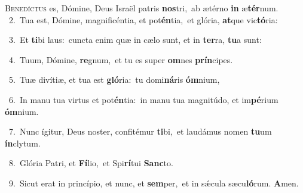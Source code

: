 \lettrine{\initial\textcolor{\initialcolor}{B}}{enedíctus} es, Dómine, Deus Israël patris \textbf{nos}\-tri,~\star ab ætérno \textbf{in} æ\-\textbf{tér}\-num.\\
{\numbfont\textcolor{\numbcolor}{~2.}}~Tua est, Dómine, magnificéntia, et pot\-\textbf{én}\-tia,~\star et glória, \textbf{at}\-que vic\-\textbf{tó}\-ria:\par
{\numbfont\textcolor{\numbcolor}{~3.}}~Et \textbf{ti}\-bi laus:~\star cuncta enim quæ in cælo sunt, et in \textbf{ter}\-ra, \textbf{tu}\-a sunt:\par
{\numbfont\textcolor{\numbcolor}{~4.}}~Tuum, Dómine, \textbf{re}\-gnum,~\star et tu es super \textbf{om}\-nes \textbf{prín}\-cipes.\par
{\numbfont\textcolor{\numbcolor}{~5.}}~Tuæ divítiæ, et tua est \textbf{gló}\-ria:~\star tu domi\-\textbf{ná}\-ris \textbf{óm}\-nium,\par
{\numbfont\textcolor{\numbcolor}{~6.}}~In manu tua virtus et pot\-\textbf{én}\-tia:~\star in manu tua magnitúdo, et im\-\textbf{pé}\-rium \textbf{óm}\-nium.\par
{\numbfont\textcolor{\numbcolor}{~7.}}~Nunc ígitur, Deus noster, confitémur \textbf{ti}\-bi,~\star et laudámus nomen \textbf{tu}\-um \textbf{ín}\-clytum.\par
{\numbfont\textcolor{\numbcolor}{~8.}}~Glória Patri, et \textbf{Fí}\-lio,~\star et Spi\-\textbf{rí}\-tui \textbf{Sanc}\-to.\par
{\numbfont\textcolor{\numbcolor}{~9.}}~Sicut erat in princípio, et nunc, et \textbf{sem}\-per,~\star et in sǽcula sæcu\-\textbf{ló}\-rum. \textbf{A}\-men.\par
